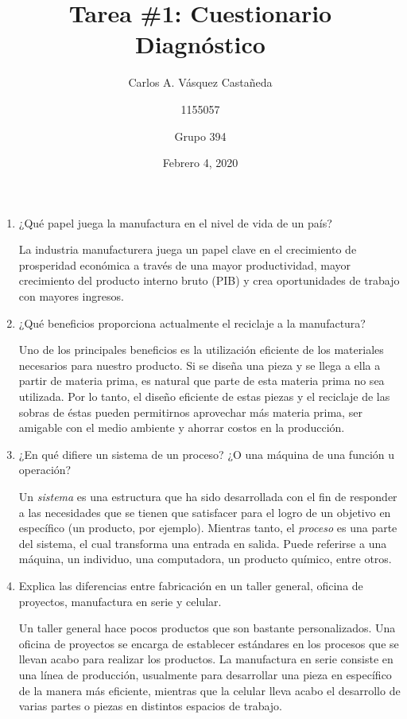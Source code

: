 \documentclass[12pt, letterpaper]{article}
\title{Tarea \#1: Cuestionario Diagnóstico}
\author{Carlos A. Vásquez Castañeda \and 1155057 \and Grupo 394}
\date{Febrero 4, 2020}
\begin{document}
\maketitle

\begin{enumerate}
	\item ¿Qué papel juega la manufactura en el nivel de vida de un país?

		La industria manufacturera juega un papel clave en el crecimiento de prosperidad económica a través de una mayor productividad, mayor crecimiento del producto interno bruto (PIB) y crea oportunidades de trabajo con mayores ingresos. \autocite{deloitte}
	
	\item ¿Qué beneficios proporciona actualmente el reciclaje a la manufactura?

		Uno de los principales beneficios es la utilización eficiente de los materiales necesarios para nuestro producto. Si se diseña una pieza y se llega a ella a partir de materia prima, es natural que parte de esta materia prima no sea utilizada. Por lo tanto, el diseño eficiente de estas piezas y el reciclaje de las sobras de éstas pueden permitirnos aprovechar más materia prima, ser amigable con el medio ambiente y ahorrar costos en la producción.\autocite {groover10}

	\item ¿En qué difiere un sistema de un proceso? ¿O una máquina de una función u operación?

		Un \textit{sistema} es una estructura que ha sido desarrollada con el fin de responder a las necesidades que se tienen que satisfacer para el logro de un objetivo en específico (un producto, por ejemplo). Mientras tanto, el \textit{proceso} es una parte del sistema, el cual transforma una entrada en salida. Puede referirse a una máquina, un individuo, una computadora, un producto químico, entre otros.

	\item Explica las diferencias entre fabricación en un taller general, oficina de proyectos, manufactura en serie y celular.
		
		Un taller general hace pocos productos que son bastante personalizados. Una oficina de proyectos se encarga de establecer estándares en los procesos que se llevan acabo para realizar los productos. La manufactura en serie consiste en una línea de producción, usualmente para desarrollar una pieza en específico de la manera más eficiente, mientras que la celular lleva acabo el desarrollo de varias partes o piezas en distintos espacios de trabajo.
	

\end{enumerate}
\end{document}
